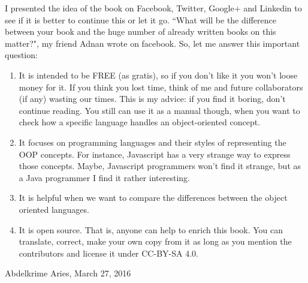 \documentclass[12pt]{book}
\begin{document}
I presented the idea of the book on Facebook, Twitter, Google+ and Linkedin to see if it is better to continue this or let it go.
``What will be the difference between your book and the huge number of already written books on this matter?", my friend Adnan wrote on facebook.
So, let me answer this important question:
\begin{enumerate}
\item It is intended to be FREE (as gratis), so if you don't like it you won't loose money for it.
If you think you lost time, think of me and future collaborators (if any) wasting our times.
This is my advice: if you find it boring, don't continue reading.
You still can use it as a manual though, when you want to check how a specific language handles an object-oriented concept.

\item It focuses on programming languages and their styles of representing the OOP concepts.
For instance, Javascript has a very strange way to express those concepts.
Maybe, Javascript programmers won't find it strange, but as a Java programmer I find it rather interesting.

\item It is helpful when we want to compare the differences between the object oriented languages.

\item It is open source.
That is, anyone can help to enrich this book.
You can translate, correct, make your own copy from it as long as you mention the contributors and license it under CC-BY-SA 4.0.

\end{enumerate}
\vfill
\begin{flushright}
Abdelkrime Aries, March 27, 2016
\end{flushright}

\ifx\wholebook\relax\else
% 
% 
	
\end{document}
